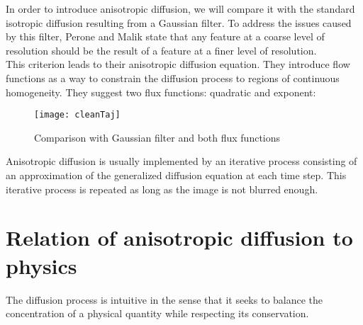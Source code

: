 \documentclass{article}
\begin{document}
In order to introduce anisotropic diffusion, we will compare it with the standard isotropic diffusion resulting from a Gaussian filter. To address the issues caused by this filter, Perone and Malik state that any feature at a coarse level of resolution should be the result of a feature at a finer level of resolution.\\
This criterion leads to their anisotropic diffusion equation. They
introduce flow functions as a way to constrain the diffusion process to regions of continuous homogeneity. They suggest two flux functions: quadratic and exponent:

\setlength{\belowcaptionskip}{0.5cm}
\begin{figure}[h]
\caption{Comparison with Gaussian filter and both flux functions} %
\centering
\hspace*{-0.3cm}\texttt{[image: cleanTaj]}
\end{figure}

Anisotropic diffusion is usually implemented by an iterative process consisting of an approximation of the generalized diffusion equation at each time step. This iterative process is repeated as long as the image is not blurred enough.



\section{Relation of anisotropic diffusion to physics}

The diffusion process is intuitive in the sense that it seeks to balance the concentration of a physical quantity while respecting its conservation.
\end{document}
